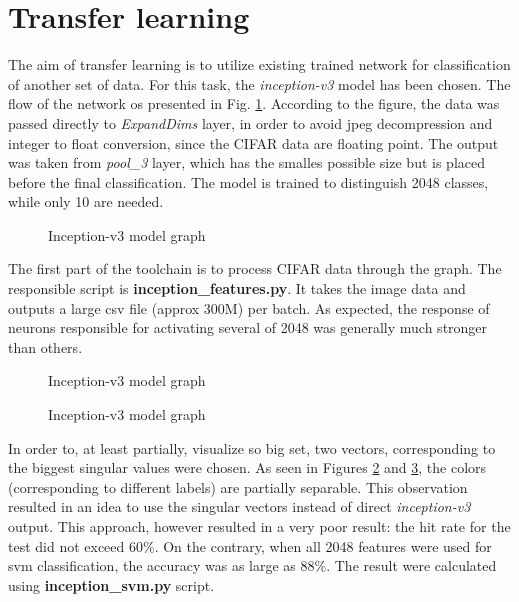 \documentclass{article}
\begin{document}
\section{Transfer learning}

The aim of transfer learning is to utilize existing trained network for classification
of another set of data. For this task, the {\em inception-v3} model has been chosen.
The flow of the network os presented in Fig. \ref{incept}. According to the
figure, the data was passed directly to {\em ExpandDims} layer, in order to avoid
jpeg decompression and integer to float conversion, since the CIFAR data are
floating point. The output was taken from {\em pool\_3} layer,
which has the smalles possible size but is placed before the final classification.
The model is trained to distinguish 2048 classes, while only 10 are needed.

\begin{figure}[!hbt]
  \centering
  \caption{\label{incept}Inception-v3 model graph}
\end{figure}

The first part of the toolchain is to process CIFAR data through the
graph. The responsible script is  {\bf inception\_features.py}.
It takes the image data and outputs a large csv file (approx 300M)
per batch. As expected, the response of neurons responsible for activating
several of 2048 was generally much stronger than others.


\begin{figure}[!hbt]
  \centering
  \caption{\label{svd1}Inception-v3 model graph}
\end{figure}

\begin{figure}[!hbt]
  \centering
  \caption{\label{svd2}Inception-v3 model graph}
\end{figure}

In order to, at least partially, visualize so big set, two vectors,
corresponding to the biggest singular values were chosen. As seen
in Figures \ref{svd1} and \ref{svd2}, the colors (corresponding
to different labels) are partially separable. This observation
resulted in an idea to use the singular vectors instead
of direct {\it inception-v3} output. This approach, however
resulted in a very poor result: the hit rate for the test
did not exceed  60\%. On the contrary, when all 2048
features were used for svm classification, the accuracy
was as large as 88\%. The result were calculated using 
{\bf inception\_svm.py} script.
\end{document}
